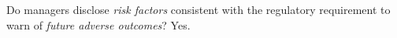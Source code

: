 
Do managers disclose \textit{risk factors} consistent with the regulatory requirement to warn of \textit{future adverse outcomes}?
Yes.
